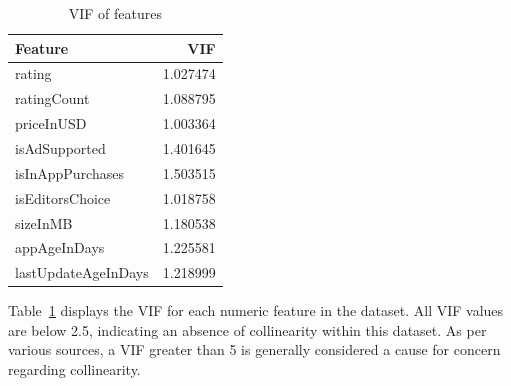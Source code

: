 \begin{table}[ht]
    \centering
    \begin{tabular}{lr}
    \toprule
    Feature & VIF \\
    \midrule
    \hline %
    rating & 1.027474 \\
    ratingCount & 1.088795 \\
    priceInUSD & 1.003364 \\
    isAdSupported & 1.401645 \\
    isInAppPurchases & 1.503515 \\
    isEditorsChoice & 1.018758 \\
    sizeInMB & 1.180538 \\
    appAgeInDays & 1.225581 \\
    lastUpdateAgeInDays & 1.218999 \\
    \end{tabular}
    \caption{VIF of features}
    \label{tab:vif}
\end{table}


Table~\ref{tab:vif} displays the VIF for each numeric feature in the dataset. All VIF values are below 2.5, indicating an absence of collinearity within this dataset. As per various sources, a VIF greater than 5 is generally considered a cause for concern regarding collinearity.

